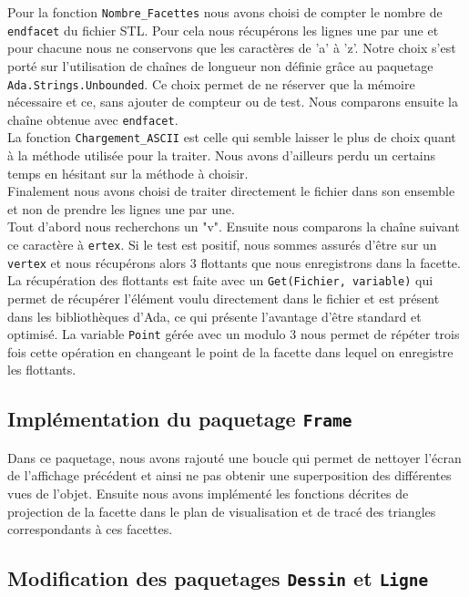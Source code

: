 \documentclass[10pt]{article}
\begin{document}
Pour la fonction \lstinline!Nombre_Facettes! nous avons choisi de compter le nombre de \lstinline!endfacet! du fichier STL. Pour cela nous récupérons les lignes une par une et pour chacune nous ne conservons que les caractères de 'a' à 'z'. Notre choix s'est porté sur l'utilisation de chaînes de longueur non définie grâce au paquetage \lstinline!Ada.Strings.Unbounded!. Ce choix permet de ne réserver que la mémoire nécessaire et ce, sans ajouter de compteur ou de test. Nous comparons ensuite la chaîne obtenue avec \lstinline!endfacet!.\\
La fonction \lstinline!Chargement_ASCII! est celle qui semble laisser le plus de choix quant à la méthode utilisée pour la traiter. Nous avons d'ailleurs perdu un certains temps en hésitant sur la méthode à choisir.\\
Finalement nous avons choisi de traiter directement le fichier dans son ensemble et non de prendre les lignes une par une.\\ 
Tout d'abord nous recherchons un "v". Ensuite nous comparons la chaîne suivant ce caractère à \lstinline!ertex!. Si le test est positif, nous sommes assurés d'être sur un \lstinline!vertex! et nous récupérons alors 3 flottants que nous enregistrons dans la facette. La récupération des flottants est faite avec un \lstinline!Get(Fichier, variable)! qui permet de récupérer l'élément voulu directement dans le fichier et est présent dans les bibliothèques d'Ada, ce qui présente l'avantage d'être standard et optimisé.
La variable \lstinline!Point! gérée avec un modulo 3 nous permet de répéter trois fois cette opération en changeant le point de la facette dans lequel on enregistre les flottants.

\subsection{Implémentation du paquetage \lstinline!Frame!}

Dans ce paquetage, nous avons rajouté une boucle qui permet de nettoyer l'écran de l'affichage précédent et ainsi ne pas obtenir une superposition des différentes vues de l'objet.
Ensuite nous avons implémenté les fonctions décrites de projection de la facette dans le plan de visualisation et de tracé des triangles correspondants à ces facettes.

\subsection{Modification des paquetages \lstinline!Dessin! et \lstinline!Ligne!}
\end{document}
